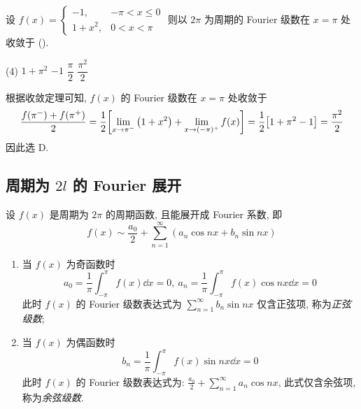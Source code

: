 \begin{example}
    设 $f(x)=\begin{cases}
        -1, & -\pi <x\leqslant 0\\ 1+x^2,&0<x<\pi
    \end{cases}$ 则以 $2\pi$ 为周期的 Fourier 级数在 $x=\pi$ 处收敛于 (\quad).
    \begin{tasks}(4)
        \task $1+\pi^2$
        \task $-1$
        \task $\dfrac{\pi}{2}$
        \task $\dfrac{\pi^2}{2}$
    \end{tasks}
\end{example}
\begin{solution}
    根据收敛定理可知, $f(x)$ 的 Fourier 级数在 $x=\pi$ 处收敛于 $$
    \dfrac{f\qty(\pi^-)+f\qty(\pi^+)}{2}=\dfrac{1}{2}\qty[\lim_{x \to \pi^-}\qty(1+x^2)+\lim_{x \to (-\pi)^+}f(x)]=\dfrac{1}{2}\qty[1+\pi^2-1]=\dfrac{\pi^2}{2}
    $$
    因此选 D.
\end{solution}

\subsection{周期为 \texorpdfstring{$2l$}. 的 Fourier 展开}

\begin{definition}[正弦级数与余弦级数]
    设 $ f(x) $ 是周期为 $ 2 \pi $ 的周期函数, 且能展开成 Fourier 系数, 即
    $$f(x) \sim \frac{a_{0}}{2}+\sum_{n=1}^{\infty}\left(a_{n} \cos n x+b_{n} \sin n x\right)$$
    \begin{enumerate}[label=(\arabic{*})]
        \item 当 $ f(x) $ 为奇函数时
              $$a_{0}=\frac{1}{\pi} \int_{-\pi}^{\pi} f(x) \dd  x=0,~ a_{n}=\frac{1}{\pi} \int_{-\pi}^{\pi} f(x) \cos n x \dd  x=0$$
              此时 $ f(x) $ 的 Fourier 级数表达式为 $\displaystyle \sum_{n=1}^{\infty} b_{n} \sin n x $ 仅含正弦项, 称为\textit{正弦级数};
        \item 当 $ f(x) $ 为偶函数时
              $$b_{n}=\frac{1}{\pi} \int_{-\pi}^{\pi} f(x) \sin n x \dd  x=0$$
              此时 $ f(x) $ 的 Fourier 级数表达式为: $\displaystyle \frac{a_{0}}{2}+\sum_{n=1}^{\infty} a_{n} \cos n x$, 此式仅含余弦项, 
              称为\textit{余弦级数}.
    \end{enumerate}
\end{definition}

